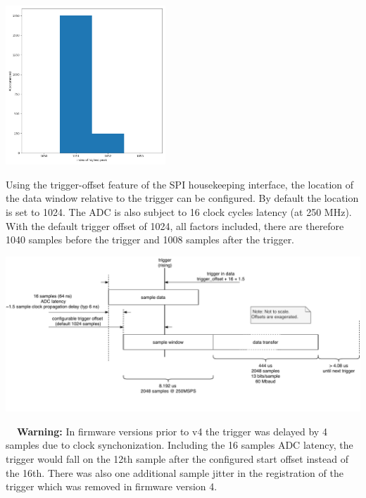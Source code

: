 \documentclass[a4paper,indent]{paper}
\newenvironment{warning}
{\par\begin{mdframed}[linewidth=2pt,linecolor=orange,backgroundcolor=orange!10]%
    \begin{list}{}{\leftmargin=0mm}\item[\bf\danger{}~~Warning: ]}
  {\end{list}\end{mdframed}\par}
\begin{document}
\begin{center}
  \includegraphics[width=6cm]{img/trigger_hist.png}
\end{center}

Using the trigger-offset feature of the \ac{SPI} housekeeping interface, the location of the data window relative to the trigger can be configured. By default the location is set to 1024. 
The \ac{ADC} is also subject to 16 clock cycles latency (at 250 MHz). With the default trigger offset of 1024, all factors included, there are therefore 1040 samples before the trigger and 1008 samples after the trigger.

\begin{center}
  \includegraphics[width=\textwidth]{img/rd_timing_v2.pdf}
  \label{fig:rd_timing}
\end{center}

\begin{warning}
  In firmware versions prior to v4 the trigger was delayed by 4 samples due to clock synchonization. Including the 16 samples ADC latency, the trigger would fall on the 12th sample after the configured start offset instead of the 16th. There was also one additional sample jitter in the registration of the trigger which was removed in firmware version 4. 
\end{warning}
\end{document}
